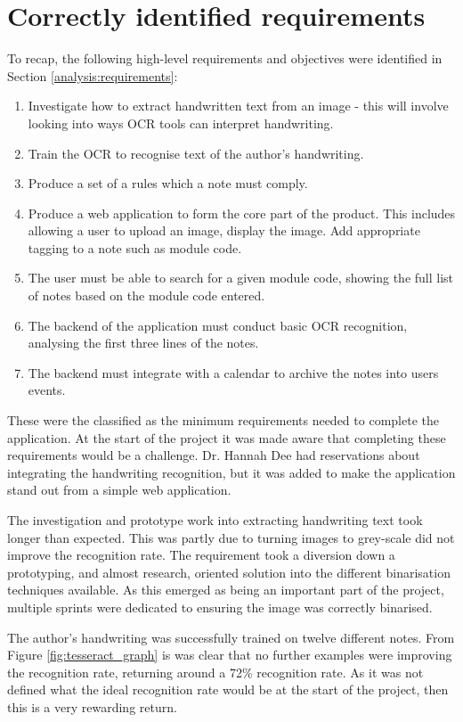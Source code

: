 \section{Correctly identified requirements}
To recap, the following high-level requirements and objectives were identified in Section \ref{analysis:requirements}:
\begin{enumerate}
	\item Investigate how to extract handwritten text from an image - this will involve looking into ways OCR tools can interpret handwriting.
	\item Train the OCR to recognise text of the author's handwriting.
	\item Produce a set of a rules which a note must comply.
	\item Produce a web application to form the core part of the product. This includes allowing a user to upload an image, display the image. Add appropriate tagging to a note such as module code.
	\item The user must be able to search for a given module code, showing the full list of notes based on the module code entered.
	\item The backend of the application must conduct basic OCR recognition, analysing the first three lines of the notes.
	\item The backend must integrate with a calendar to archive the notes into users events.
\end{enumerate}

\noindent
These were the classified as the minimum requirements needed to complete the application. At the start of the project it was made aware that completing these requirements would be a challenge. Dr. Hannah Dee had reservations about integrating the handwriting recognition, but it was added to make the application stand out from a simple web application.

The investigation and prototype work into extracting handwriting text took longer than expected. This was partly due to turning images to grey-scale did not improve the recognition rate. The requirement took a diversion down a prototyping, and almost research, oriented solution into the different binarisation techniques available. As this emerged as being an important part of the project, multiple sprints were dedicated to ensuring the image was correctly binarised.

The author's handwriting was successfully trained on twelve different notes. From Figure \ref{fig:tesseract_graph} is was clear that no further examples were improving the recognition rate, returning around a 72\% recognition rate. As it was not defined what the ideal recognition rate would be at the start of the project, then this is a very rewarding return.

